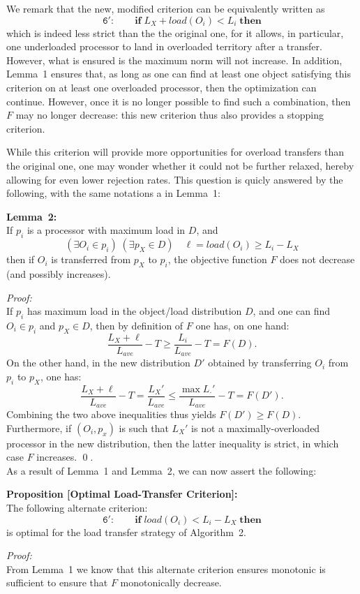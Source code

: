 We remark that the new, modified criterion can be equivalently written
as
\[
\mathtt{6':} \qquad \mathrm{\mathbf{if}} \; L_X + load(O_i) < L_i
\; \mathrm{\mathbf{then}}
\]
which is indeed less strict than the the original one, for it allows,
in particular, one underloaded processor to land in overloaded
territory after a transfer. However, what is ensured is the maximum
norm will not increase.
In addition, Lemma~1 ensures that, as long as one can find at least
one object satisfying this criterion on at least one overloaded
processor, then the optimization can continue. However, once it is no
longer possible to find such a combination, then $F$ may no longer
decrease: this new criterion thus also provides a stopping criterion.

While this criterion will provide more opportunities for overload
transfers than the original one, one may wonder whether it could not
be further relaxed, hereby allowing for even lower rejection rates.
This question is quicly answered by the following, with the same
notations a in Lemma~1:
\par\textbf{Lemma~2:}\\
If $p_i$ is a processor with maximum load in $D$, and
\[
(\exists O_i \in p_i)\; (\exists p_X \in D) \quad \ell = load(O_i) \ge{} L_i - L_X
\]
then if $O_i$ is transferred from $p_X$ to $p_i$, the objective
function $F$ does not decrease (and possibly increases).
\par\textit{Proof:}\\
If $p_i$ has maximum load in the object/load distribution $D$, and one
can find $O_i\in{}p_i$ and $p_X\in{}D$, then by definition of $F$ one
has, on one hand:
\[
\frac{L_X + \ell}{L_{ave}} - T \ge \frac{L_i}{L_{ave}} - T = F(D).
\]
On the other hand, in the new distribution $D'$ obtained by
transferring $O_i$ from $p_i$ to $p_X$, one has:
\[
\frac{L_X + \ell}{L_{ave}} - T = \frac{L_X'}{L_{ave}}
\le \frac{\max{L_{\cdot}'}}{L_{ave}} - T = F(D').
\]
Combining the two above inequalities thus yields
$F(D')\ge{}F(D)$. Furthermore, if $(O_i,p_x)$ is such that $L_X'$ is
not a maximally-overloaded processor in the new distribution, then the
latter inequality is strict, in which case $F$ increases.
\hfill\qed.\\
As a result of Lemma~1 and Lemma~2, we can now assert the following:
\par\textbf{Proposition [Optimal Load-Transfer Criterion]:}\\
The following alternate criterion:
\[
\mathtt{6':} \qquad \mathrm{\mathbf{if}} \; load(O_i) < L_i - L_X
\; \mathrm{\mathbf{then}}
\]
is optimal for the load transfer strategy of Algorithm~2.
\par\textit{Proof:}\\
From Lemma~1 we know that this alternate criterion ensures monotonic
is sufficient to ensure that $F$ monotonically decrease.

